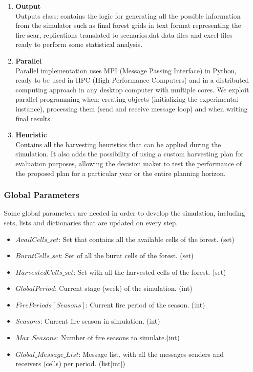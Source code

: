 \documentclass[11pt]{article}
\begin{document}
\begin{enumerate}
	\item \textbf{Output}\\	
		Outputs class: contains the logic for generating all the possible information from the simulator such as final forest grids in text format representing the fire scar, replications translated to scenarios.dat data files and excel files ready to perform some statistical analysis.
	
	\item \textbf{Parallel}\\
	Parallel implementation uses MPI (Message Passing Interface) in Python, ready to be used in HPC (High Performance Computers) and in a distributed computing approach in any desktop computer with multiple cores. We exploit parallel programming when: creating objects (initializing the experimental instance), processing them (send and receive message loop) and when writing final results.
		
	\item \textbf{Heuristic}\\
		Contains all the harvesting heuristics that can be applied during the simulation. It also adds the possibility of using a custom harvesting plan for evaluation purposes, allowing the decision maker to test the performance of the proposed plan for a particular year or the entire planning horizon.
	
\end{enumerate}
\subsubsection{Global Parameters}
	Some global parameters are needed in order to develop the simulation, including sets, lists and dictionaries that are updated on every step.
	\begin{itemize}
		\item $AvailCells\_set$: Set that contains all the available cells of the forest. \hfill (set)
		\item $BurntCells\_set$: Set of all the burnt cells of the forest. \hfill (set)
		\item $HarvestedCells\_set$: Set with all the harvested cells of the forest. \hfill (set)
		\item $GlobalPeriod$: Current stage (week) of the simulation. \hfill (int)
		\item $FirePeriods[Seasons]$: Current fire period of the season. \hfill (int)
		\item $Seasons$: Current fire season in simulation. \hfill (int)
		\item $Max\_Seasons$: Number of fire seasons to simulate.\hfill (int)

		\item $Global\_Message\_List$: Message list, with all the messages senders and receivers (cells) per period. \hfill (list[int])
	\end{itemize}	 
\end{document}
